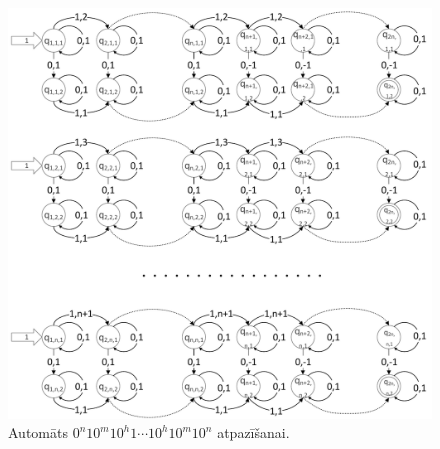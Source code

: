 \documentclass{ludis}
\begin{document}
\begin{pieradijums}
\begin{figure}[h!]
\centering
\includegraphics[width=\textwidth]{Img/1pfa.pdf}
\caption{Automāts $0^n10^m10^h1 \cdots 10^h10^m10^n$ atpazīšanai.}
\label{fig:1pfa}
\end{figure}


\end{pieradijums}
\end{document}
